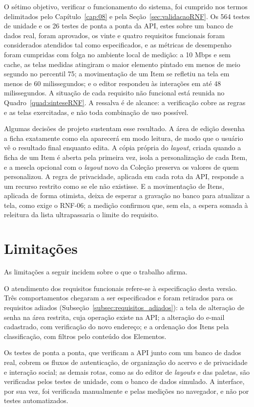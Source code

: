 O sétimo objetivo, verificar o funcionamento do sistema, foi cumprido nos termos delimitados pelo Capítulo~\ref{cap:08} e pela Seção~\ref{sec:validacaoRNF}. Os 564 testes de unidade e os 26 testes de ponta a ponta da API, estes sobre um banco de dados real, foram aprovados, os vinte e quatro requisitos funcionais foram considerados atendidos tal como especificados, e as métricas de desempenho foram cumpridas com folga no ambiente local de medição: a 10 Mbps e sem cache, as telas medidas atingiram o maior elemento pintado em menos de meio segundo no percentil 75; a movimentação de um Item se refletiu na tela em menos de 60 milissegundos; e o editor respondeu às interações em até 48 milissegundos. A situação de cada requisito não funcional está reunida no Quadro~\ref{quad:sinteseRNF}. A ressalva é de alcance: a verificação cobre as regras e as telas exercitadas, e não toda combinação de uso possível.

Algumas decisões de projeto sustentam esse resultado. A área de edição desenha a ficha exatamente como ela aparecerá em modo leitura, de modo que o usuário vê o resultado final enquanto edita. A cópia própria do \textit{layout}, criada quando a ficha de um Item é aberta pela primeira vez, isola a personalização de cada Item, e a mescla opcional com o \textit{layout} novo da Coleção preserva os valores de quem personalizou. A regra de privacidade, aplicada em cada rota da API, responde a um recurso restrito como se ele não existisse. E a movimentação de Itens, aplicada de forma otimista, deixa de esperar a gravação no banco para atualizar a tela, como exige o RNF-06; a medição confirmou que, sem ela, a espera somada à releitura da lista ultrapassaria o limite do requisito.

\section{Limitações}

As limitações a seguir incidem sobre o que o trabalho afirma.

O atendimento dos requisitos funcionais refere-se à especificação desta versão. Três comportamentos chegaram a ser especificados e foram retirados para os requisitos adiados (Subseção~\ref{subsec:requisitos_adiados}): a tela de alteração de senha na área restrita, cuja operação existe na API; a alteração do e-mail cadastrado, com verificação do novo endereço; e a ordenação dos Itens pela classificação, com filtros pelo conteúdo dos Elementos.

Os testes de ponta a ponta, que verificam a API junto com um banco de dados real, cobrem os fluxos de autenticação, de organização do acervo e de privacidade e interação social; as demais rotas, como as do editor de \textit{layouts} e das paletas, são verificadas pelos testes de unidade, com o banco de dados simulado. A interface, por sua vez, foi verificada manualmente e pelas medições no navegador, e não por testes automatizados.

